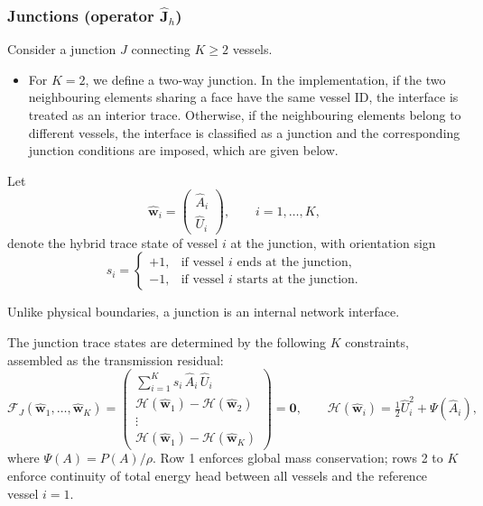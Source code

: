 \documentclass[11pt]{article}
\begin{document}
\subsubsection{Junctions (operator $\widehat{\mathbf J}_h$)}
Consider a junction $J$ connecting $K\ge 2$ vessels. 
\begin{itemize}
    \item For $K=2$, we define a two-way junction. In the implementation, if the two neighbouring elements sharing a face have the same vessel ID, the interface is treated as an interior trace. Otherwise, if the neighbouring elements belong to different vessels, the interface is classified as a junction and the corresponding junction conditions are imposed, which are given below.
\end{itemize}
Let
\[
\widehat{\mathbf{w}}_i
=
\begin{pmatrix}
\widehat{A}_i \\ \widehat{U}_i
\end{pmatrix},
\qquad i = 1,\ldots,K,
\]
denote the hybrid trace state of vessel $i$ at the junction, with
orientation sign
\[
s_i =
\begin{cases}
+1, & \text{if vessel } i \text{ ends at the junction},\\
-1, & \text{if vessel } i \text{ starts at the junction}.
\end{cases}
\]

Unlike physical boundaries, a junction is an internal network interface.

The junction trace states are determined by the following
$K$ constraints, assembled as the transmission residual:
\begin{equation}
\mathcal{F}_J
(\widehat{\mathbf{w}}_1,\ldots,\widehat{\mathbf{w}}_K)
=
\begin{pmatrix}
\displaystyle\sum_{i=1}^{K}
s_i\,\widehat{A}_i\,\widehat{U}_i
\\[10pt]
\mathcal{H}(\widehat{\mathbf{w}}_1)
- \mathcal{H}(\widehat{\mathbf{w}}_2)
\\[4pt]
\vdots
\\[4pt]
\mathcal{H}(\widehat{\mathbf{w}}_1)
- \mathcal{H}(\widehat{\mathbf{w}}_K)
\end{pmatrix}
= \mathbf{0},
\qquad
\mathcal{H}(\widehat{\mathbf{w}}_i)
=
\tfrac{1}{2}\widehat{U}_i^2 + \Psi(\widehat{A}_i),
\label{eq:junction_transmission}
\end{equation}
where $\Psi(A) = P(A)/\rho$. Row 1 enforces global mass
conservation; rows 2 to $K$ enforce continuity of total energy
head between all vessels and the reference vessel $i=1$.
\end{document}

